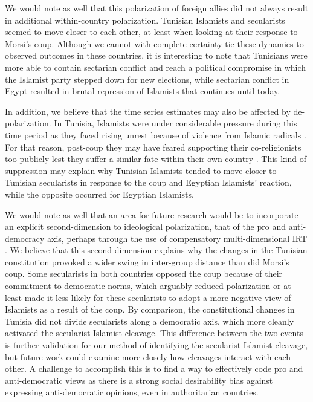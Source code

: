 \documentclass[12pt]{article}
\begin{document}
We would note as well that this polarization of foreign allies did not always result in additional within-country polarization. Tunisian Islamists and secularists seemed to move closer to each other, at least when looking at their response to Morsi's coup. Although we cannot with complete certainty tie these dynamics to observed outcomes in these countries, it is interesting to note that Tunisians were more able to contain sectarian conflict and reach a political compromise in which the Islamist party stepped down for new elections, while sectarian conflict in Egypt resulted in brutal repression of Islamists that continues until today.

In addition, we believe that the time series estimates may also be affected by de-polarization. In Tunisia, Islamists were under considerable pressure during this time period as they faced rising unrest because of violence from Islamic radicals \parencite{mccarthy2016}. For that reason, post-coup they may have feared supporting their co-religionists too publicly lest they suffer a similar fate within their own country \parencite{grewal2016}. This kind of suppression may explain why Tunisian Islamists tended to move closer to Tunisian secularists in response to the coup and Egyptian Islamists' reaction, while the opposite occurred for Egyptian Islamists. 

We would note as well that an area for future research would be to incorporate an explicit second-dimension to ideological polarization, that of the pro and anti-democracy axis, perhaps through the use of compensatory multi-dimensional IRT \parencite{reckase2009}. We believe that this second dimension explains why the changes in the Tunisian constitution provoked a wider swing in inter-group distance than did Morsi's coup. Some secularists in both countries opposed the coup because of their commitment to democratic norms, which arguably reduced polarization or at least made it less likely for these secularists to adopt a more negative view of Islamists as a result of the coup. By comparison, the constitutional changes in Tunisia did not divide secularists along a democratic axis, which more cleanly activated the secularist-Islamist cleavage. This difference between the two events is further validation for our method of identifying the secularist-Islamist cleavage, but future work could examine more closely how cleavages interact with each other. A challenge to accomplish this is to find a way to effectively code pro and anti-democratic views as there is a strong social desirability bias against expressing anti-democratic opinions, even in authoritarian countries.
\end{document}
